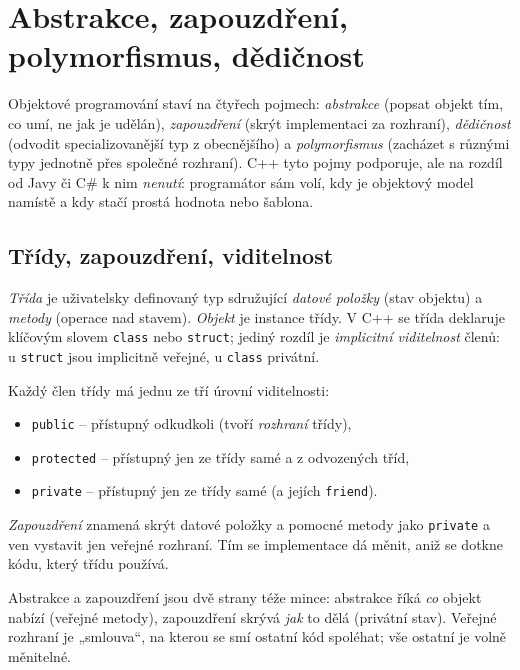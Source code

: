 \documentclass[11pt,a4paper]{article}
\newcommand{\cd}{\lstinline[style=cpp]}
\begin{document}
\section{Abstrakce, zapouzdření, polymorfismus, dědičnost}

Objektové programování staví na čtyřech pojmech: \emph{abstrakce} (popsat objekt tím, co umí, ne jak je udělán), \emph{zapouzdření} (skrýt implementaci za rozhraní), \emph{dědičnost} (odvodit specializovanější typ z obecnějšího) a \emph{polymorfismus} (zacházet s různými typy jednotně přes společné rozhraní). C++ tyto pojmy podporuje, ale na rozdíl od Javy či C\# k nim \emph{nenutí}: programátor sám volí, kdy je objektový model namístě a kdy stačí prostá hodnota nebo šablona.

\subsection{Třídy, zapouzdření, viditelnost}

\begin{definice}
\emph{Třída} je uživatelsky definovaný typ sdružující \emph{datové položky} (stav objektu) a \emph{metody} (operace nad stavem). \emph{Objekt} je instance třídy. V C++ se třída deklaruje klíčovým slovem \cd{class} nebo \cd{struct}; jediný rozdíl je \emph{implicitní viditelnost} členů: u \cd{struct} jsou implicitně veřejné, u \cd{class} privátní.
\end{definice}

\begin{definice}
Každý člen třídy má jednu ze tří úrovní viditelnosti:
\begin{itemize}
  \item \cd{public} -- přístupný odkudkoli (tvoří \emph{rozhraní} třídy),
  \item \cd{protected} -- přístupný jen ze třídy samé a z odvozených tříd,
  \item \cd{private} -- přístupný jen ze třídy samé (a jejích \cd{friend}).
\end{itemize}
\emph{Zapouzdření} znamená skrýt datové položky a pomocné metody jako \cd{private} a ven vystavit jen veřejné rozhraní. Tím se implementace dá měnit, aniž se dotkne kódu, který třídu používá.
\end{definice}

\begin{intuice}
Abstrakce a zapouzdření jsou dvě strany téže mince: abstrakce říká \emph{co} objekt nabízí (veřejné metody), zapouzdření skrývá \emph{jak} to dělá (privátní stav). Veřejné rozhraní je „smlouva``, na kterou se smí ostatní kód spoléhat; vše ostatní je volně měnitelné.
\end{intuice}
\end{document}
